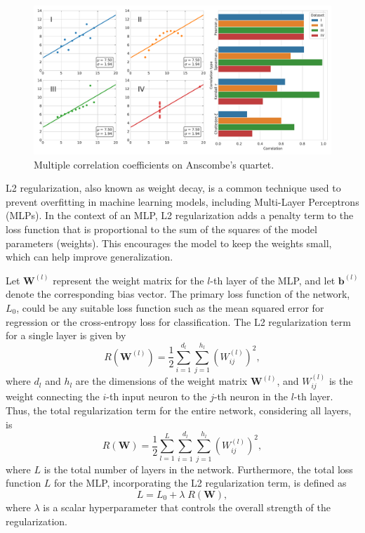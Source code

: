 
\begin{figure}[!ht]
\centering
\caption{Multiple correlation coefficients on Anscombe's quartet.}
    \includegraphics[width=1\linewidth]{images/anscombe_quartet.pdf}
\end{figure}



L2 regularization, also known as weight decay, is a common technique used to prevent overfitting in machine learning models, including Multi-Layer Perceptrons (MLPs). In the context of an MLP, L2 regularization adds a penalty term to the loss function that is proportional to the sum of the squares of the model parameters (weights). This encourages the model to keep the weights small, which can help improve generalization.

Let $\mathbf{W}^{(l)}$ represent the weight matrix for the $l$-th layer of the MLP, and let $\mathbf{b}^{(l)}$ denote the corresponding bias vector. The primary loss function of the network, $L_0$, could be any suitable loss function such as the mean squared error for regression or the cross-entropy loss for classification. The L2 regularization term for a single layer is given by
\begin{equation}
R(\mathbf{W}^{(l)}) = \frac{1}{2} \sum_{i=1}^{d_l} \sum_{j=1}^{h_l} \left( W^{(l)}_{ij} \right)^2,
\end{equation}
where $d_l$ and $h_l$ are the dimensions of the weight matrix $\mathbf{W}^{(l)}$, and $W^{(l)}_{ij}$ is the weight connecting the $i$-th input neuron to the $j$-th neuron in the $l$-th layer. Thus, the total regularization term for the entire network, considering all layers, is
\begin{equation}
R(\mathbf{W}) = \frac{1}{2} \sum_{l=1}^{L} \sum_{i=1}^{d_l} \sum_{j=1}^{h_l} \left( W^{(l)}_{ij} \right)^2,
\end{equation}
where $L$ is the total number of layers in the network. Furthermore, the total loss function $L$ for the MLP, incorporating the L2 regularization term, is defined as
\begin{equation}
L = L_0 + \lambda \; R(\mathbf{W}),
\end{equation}
where $\lambda$ is a scalar hyperparameter that controls the overall strength of the regularization.

